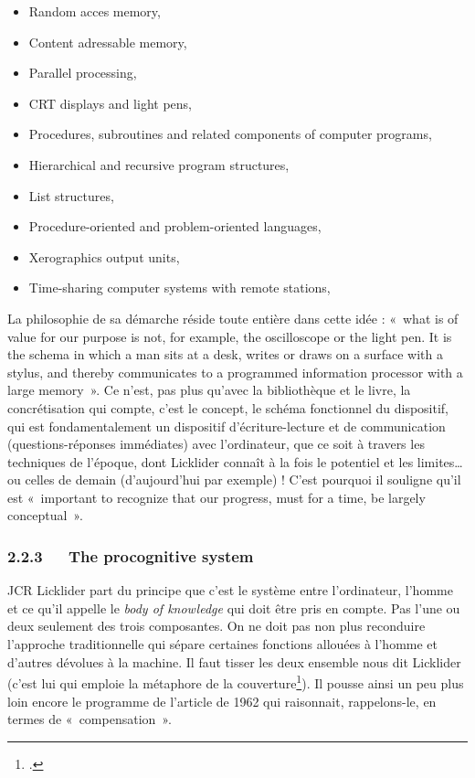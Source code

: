 \documentclass{FramateX}
\begin{document}
\begin{refsection}
\begin{itemize}
\item Random acces memory,
\item Content adressable memory,
\item Parallel processing,
\item CRT displays and light pens,
\item Procedures, subroutines and related components of computer
programs,
\item Hierarchical and recursive program structures,
\item List structures,
\item Procedure-oriented and problem-oriented languages,
\item Xerographics output units,
\item Time-sharing computer systems with remote stations,
\end{itemize}



La philosophie de sa démarche réside toute entière dans cette idée :
«~what is of value for our purpose is not, for example, the
oscilloscope or the light pen. It is the schema in which a man sits at
a desk, writes or draws on a surface with a stylus, and thereby
communicates to a programmed information processor with a large
memory~». Ce n'est, pas plus qu'avec la bibliothèque et le livre, la
concrétisation qui compte, c'est le concept, le schéma fonctionnel du
dispositif, qui est fondamentalement un dispositif d'écriture-lecture
et de communication (questions-réponses immédiates) avec l'ordinateur,
que ce soit à travers les techniques de l'époque, dont Licklider
connaît à la fois le potentiel et les limites\ldots ou celles de demain
(d'aujourd'hui par exemple) ! C'est pourquoi il souligne qu'il est
«~important to recognize that our progress, must for a time, be largely
conceptual~».


\subsubsection*{2.2.3~~~The procognitive system}
{}

JCR Licklider part du principe que c'est le système entre l'ordinateur,
l'homme et ce qu'il appelle le \textit{body of knowledge} qui doit être pris
en compte. Pas l'une ou deux seulement des trois composantes. On ne
doit pas non plus reconduire l'approche traditionnelle qui sépare
certaines fonctions allouées à l'homme et d'autres dévolues à la
machine. Il faut tisser les deux ensemble nous dit  Licklider (c'est
lui qui emploie la métaphore de la couverture\footnote{\cite[p.~91]{lickliderlibraries1965}.}). Il
pousse ainsi un peu plus loin encore le programme de l'article de 1962
qui raisonnait, rappelons-le, en termes de «~compensation~».





\end{refsection}
\end{document}
